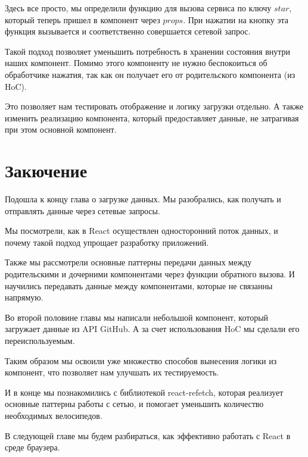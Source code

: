 Здесь все просто, мы определили функцию для вызова сервиса по ключу $star$, который теперь пришел в компонент через $props$. При нажатии на кнопку эта функция вызывается и соответственно совершается сетевой запрос.

Такой подход позволяет уменьшить потребность в хранении состояния внутри наших компонент. Помимо этого компоненту не нужно беспокоиться об обработчике нажатия, так как он получает его от родительского компонента (из HoC).

Это позволяет нам тестировать отображение и логику загрузки отдельно. А также изменить реализацию компонента, который предоставляет данные, не затрагивая при этом основной компонент.

\section{Закючение}

Подошла к концу глава о загрузке данных. Мы разобрались, как получать и отправлять данные через сетевые запросы.

Мы посмотрели, как в React осуществлен односторонний поток данных, и почему такой подход упрощает разработку приложений.

Также мы рассмотрели основные паттерны передачи данных между родительскими и дочерними компонентами через функции обратного вызова. И научились передавать данные между компонентами, которые не связанны напрямую.

Во второй половине главы мы написали небольшой компонент, который загружает данные из API GitHub. А за счет использования HoC мы сделали его переиспользуемым.

Таким образом мы освоили уже множество способов вынесения логики из компонент, что позволяет нам улучшать их тестируемость.

И в конце мы познакомились с библиотекой react-refetch, которая реализует основные паттерны работы с сетью, и помогает уменьшить количество необходимых велосипедов.

В следующей главе мы будем разбираться, как эффективно работать с React в среде браузера.








